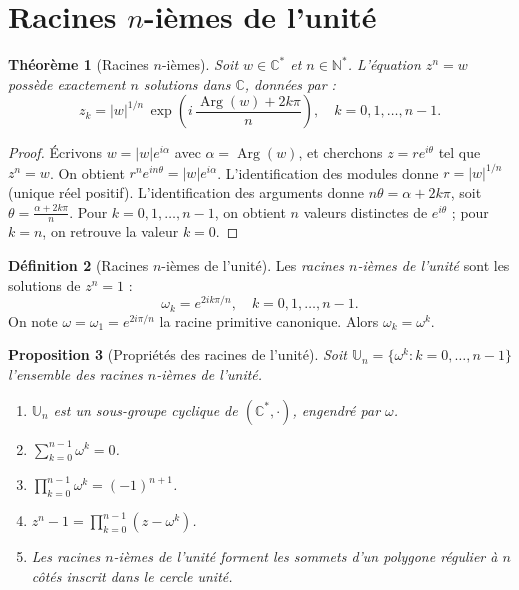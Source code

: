\documentclass[12pt,a4paper,openany]{book}
\theoremstyle{definition}
\newtheorem{definition}{Définition}[chapter]
\theoremstyle{plain}
\newtheorem{theoreme}[definition]{Théorème}
\newtheorem{proposition}[definition]{Proposition}
\theoremstyle{remark}
\newcommand{\C}{\mathbb{C}}
\newcommand{\N}{\mathbb{N}}
\DeclareMathOperator{\Arg}{Arg}
\newcommand{\abs}[1]{\left|#1\right|}
\begin{document}
\section{Racines \texorpdfstring{$n$}{n}-ièmes de l'unité}\label{sec:racines-unite}

\begin{theoreme}[Racines $n$-ièmes]\label{thm:racines-n-iemes}
Soit $w \in \C^*$ et $n \in \N^*$. L'équation $z^n = w$ possède exactement $n$ solutions dans $\C$, données par :
\[
  z_k = \abs{w}^{1/n}\, \exp\!\left(i\,\frac{\Arg(w) + 2k\pi}{n}\right), \quad k = 0, 1, \ldots, n-1.
\]
\end{theoreme}

\begin{proof}
Écrivons $w = \abs{w}e^{i\alpha}$ avec $\alpha = \Arg(w)$, et cherchons $z = re^{i\theta}$ tel que $z^n = w$. On obtient $r^n e^{in\theta} = \abs{w}e^{i\alpha}$. L'identification des modules donne $r = \abs{w}^{1/n}$ (unique réel positif). L'identification des arguments donne $n\theta = \alpha + 2k\pi$, soit $\theta = \frac{\alpha + 2k\pi}{n}$. Pour $k = 0, 1, \ldots, n-1$, on obtient $n$ valeurs distinctes de $e^{i\theta}$ ; pour $k = n$, on retrouve la valeur $k=0$.
\end{proof}

\begin{definition}[Racines $n$-ièmes de l'unité]\label{def:racines-unite}
Les \emph{racines $n$-ièmes de l'unité} sont les solutions de $z^n = 1$ :
\[
  \omega_k = e^{2ik\pi/n}, \quad k = 0, 1, \ldots, n-1.
\]
On note $\omega = \omega_1 = e^{2i\pi/n}$ la racine primitive canonique. Alors $\omega_k = \omega^k$.
\end{definition}

\begin{proposition}[Propriétés des racines de l'unité]\label{prop:racines-unite-proprietes}
Soit $\mathbb{U}_n = \{\omega^k : k = 0, \ldots, n-1\}$ l'ensemble des racines $n$-ièmes de l'unité.
\begin{enumerate}[label=(\roman*)]
  \item $\mathbb{U}_n$ est un sous-groupe cyclique de $(\C^*, \cdot)$, engendré par $\omega$.
  \item $\sum_{k=0}^{n-1} \omega^k = 0$.
  \item $\prod_{k=0}^{n-1} \omega^k = (-1)^{n+1}$.
  \item $z^n - 1 = \prod_{k=0}^{n-1}(z - \omega^k)$.
  \item Les racines $n$-ièmes de l'unité forment les sommets d'un polygone régulier à $n$ côtés inscrit dans le cercle unité.
\end{enumerate}
\end{proposition}
\end{document}
